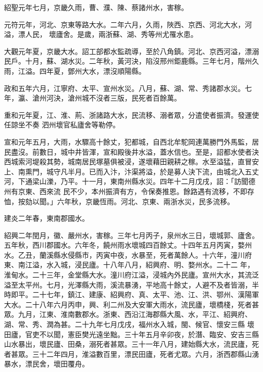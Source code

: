 \begin{pinyinscope}
 紹聖元年七月，京畿久雨，曹、濮、陳、蔡諸州水，害稼。



 元符元年，河北、京東等路大水。二年六月，久雨，陜西、京西、河北大水，河溢，漂人民，
 壞廬舍。是歲，兩浙蘇、湖、秀等州尤罹水患。



 大觀元年夏，京畿大水。詔工部都水監疏導，至於八角鎮。河北、京西河溢，漂溺民戶。十月，蘇、湖水災。二年秋，黃河決，陷沒邢州鉅鹿縣。三年七月，階州久雨，江溢。四年夏，鄧州大水，漂沒順陽縣。



 政和五年六月，江寧府、太平、宣州水災。八月，蘇、湖、常、秀諸郡水災。七年，瀛、滄州河決，滄州城不沒者三版，民死者百餘萬。



 重和元年夏，江、淮、荊、浙諸路大水，民流移、溺者眾，分遣使者振濟。發運使任諒坐不奏
 泗州壞官私廬舍等勒停。



 宣和元年五月，大雨，水驟高十餘丈，犯都城，自西北牟駝岡連萬勝門外馬監，居民盡沒。前數日，城中井皆渾，宣和殿後井水溢，蓋水信也。至是，詔都水使者決西城索河堤殺其勢，城南居民塚墓俱被浸，遂壞藉田親耕之稼。水至溢猛，直冒安上、南熏門，城守凡半月。已而入汴，汴渠將溢，於是募人決下流，由城北入五丈河，下通梁山濼，乃平。十一月，東南州縣水災。四年十二月戊戌，詔：「訪聞德州有京東、西來流
 民不少，本州振濟有方，令保奏推恩。餘路遇有流移，不即存恤，按劾以聞。」六年秋，京畿恆雨。河北、京東、兩浙水災，民多流移。



 建炎二年春，東南郡國水。



 紹興二年閏月，徽、嚴州水，害稼。三年七月丙子，泉州水三日，壞城郭、廬舍。五年秋，西川郡國水。六年冬，饒州雨水壞城四百餘丈。十四年五月丙寅，婺州水。乙丑，蘭溪縣水侵縣市，丙寅中夜，水暴至，死者萬餘人。十六年，潼川府東、南江溢，水入城，浸民廬。十八年八月，紹興府、明、婺州水。二十二
 年，淮甸水。二十三年，金堂縣大水。潼川府江溢，浸城內外民廬。宣州大水，其流泛溢至太平州。七月，光澤縣大雨，溪流暴湧，平地高十餘丈，人避不及者皆溺，半時即平。二十七年，鎮江、建康、紹興府、真、太平、池、江、洪、鄂州、漢陽軍大水。二十八年六月丙申，興、利二州及大安軍大雨水，流民廬，壞橋棧，死者甚眾。九月，江東、淮南數郡水。浙東、西沿江海郡縣大風、水，平江、紹興府、湖、常、秀、潤為甚。二十九年七月戊戌，福州水入城，閩、候官、懷安三縣
 壞田廬，官吏不以聞，憲臣樊光遠坐黜。三十年五月辛卯夜，於潛、臨安、安吉三縣山水暴出，壞民廬、田桑，溺死者甚眾。三十一年八月，建始縣大水，流民廬，死者甚眾。三十二年四月，淮溢數百里，漂民田廬，死者尤眾。六月，浙西郡縣山湧暴水，漂民舍，壞田覆舟。




\end{pinyinscope}
